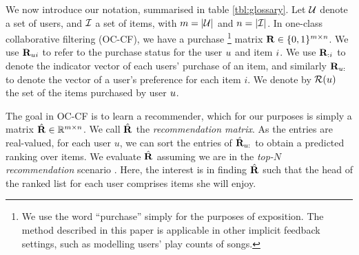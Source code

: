 
We now introduce our notation, summarised in table \ref{tbl:glossary}. %
Let $\mathcal{U}$ denote a set of users, and $\mathcal{I}$ a set of items,
with $m = | \mathcal{U} |$ and $n = | \mathcal{I} |$.
In one-class collaborative filtering (OC-CF), we have a purchase 
\footnote{We use the word ``purchase'' simply for the purposes of exposition. The method described in this paper is applicable in other implicit feedback settings, such as modelling users' play counts of songs.} 
matrix $\mathbf{R} \in \{ 0, 1 \}^{m \times n}$. %
We use $\mathbf{R}_{ui}$ to refer to the purchase status for the user $u$ and item $i$.
We use $\mathbf{R}_{:i}$ to denote the indicator vector of each users' purchase of an item, and similarly $\mathbf{R}_{u:}$ to denote the vector of a user's preference for each item $i$.
We denote by  $\mathcal{R}(u)$ the set of the items purchased by user $u$.

The goal in OC-CF is to learn a recommender, which for our purposes is simply a matrix $\hat{\mathbf{R}} \in \mathbb{R}^{m \times n}$. %
We call $\hat{\mathbf{R}}$ the \emph{recommendation matrix}.
As the entries are real-valued, for each user $u$, we can sort the entries of $\hat{\mathbf{R}}_{u:}$ to obtain a predicted ranking over items.
We evaluate $\hat{\mathbf{R}}$ assuming we are in the \emph{top-$N$ recommendation} scenario \citep{Deshpande:2004}.
Here, the interest is in finding $\hat{\mathbf{R}}$ such that the head of the ranked list for each user comprises items she will enjoy. %

\begin{table}[t]
	\centering
	\caption{Commonly used symbols.}
	\label{tbl:glossary}
\end{table}

